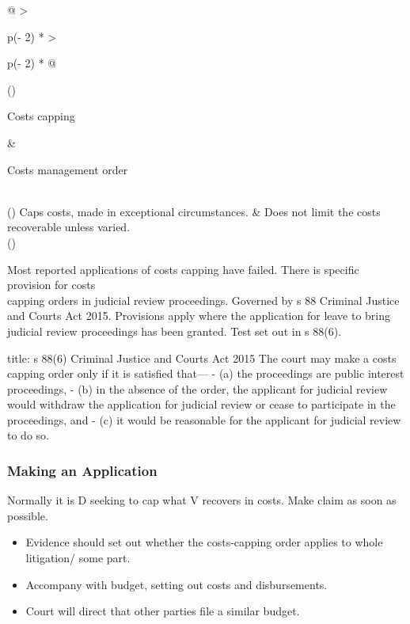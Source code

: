 \documentclass[
]{article}
\newenvironment{Shaded}{}{}
\newcommand{\NormalTok}[1]{#1}
\providecommand{\tightlist}{%
  \setlength{\itemsep}{0pt}\setlength{\parskip}{0pt}}
\begin{document}
\begin{longtable}[]{@{}
  >{\raggedright\arraybackslash}p{(\columnwidth - 2\tabcolsep) * }
  >{\raggedright\arraybackslash}p{(\columnwidth - 2\tabcolsep) * }@{}}
\toprule()
\begin{minipage}[b]{\linewidth}\raggedright
Costs capping
\end{minipage} & \begin{minipage}[b]{\linewidth}\raggedright
Costs management order
\end{minipage} \\
\midrule()
\endhead
Caps costs, made in exceptional circumstances. & Does not limit the
costs recoverable unless varied. \\
\bottomrule()
\end{longtable}

Most reported applications of costs capping have failed. There is
specific provision for costs\\
capping orders in judicial review proceedings. Governed by s 88 Criminal
Justice and Courts Act 2015. Provisions apply where the application for
leave to bring judicial review proceedings has been granted. Test set
out in s 88(6).

\begin{Shaded}
\begin{Highlighting}[]
\NormalTok{title: s 88(6) Criminal Justice and Courts Act 2015}
\NormalTok{The court may make a costs capping order only if it is satisfied that—}
\NormalTok{{-} (a) the proceedings are public interest proceedings,}
\NormalTok{{-} (b) in the absence of the order, the applicant for judicial review would withdraw the application for judicial review or cease to participate in the proceedings, and}
\NormalTok{{-} (c) it would be reasonable for the applicant for judicial review to do so.}
\end{Highlighting}
\end{Shaded}

\hypertarget{making-an-application}{%
\subsubsection{Making an Application}\label{making-an-application}}

Normally it is D seeking to cap what V recovers in costs. Make claim as
soon as possible.

\begin{itemize}
\tightlist
\item
  Evidence should set out whether the costs-capping order applies to
  whole litigation/ some part.
\item
  Accompany with budget, setting out costs and disbursements.
\item
  Court will direct that other parties file a similar budget.
\end{itemize}
\end{document}
